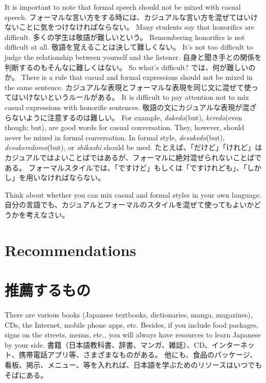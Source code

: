 \documentclass[uplatex,dvipdfmx,b5paper,english,10pt]{jsbook}
\begin{document}
\ifEnglish
It is important to note that formal speech should not be mixed with casual speech.
\else
フォーマルな言い方をする時には、カジュアルな言い方を混ぜてはいけないことに気をつけなければならない。
\fi
\ifEnglish
Many students say that honorifics are difficult.
\else
多くの学生は敬語が難しいという。
\fi
\ifEnglish
Remembering honorifics is not difficult at all.
\else
敬語を覚えることは決して難しくない。
\fi
\ifEnglish
It's not too difficult to judge the relationship between yourself and the listener.
\else
自身と聞き手との関係を判断するのもそんなに難しくはない。
\fi
\ifEnglish
So what's difficult?
\else
では、何が難しいのか。
\fi
\ifEnglish
There is a rule that casual and formal expressions should not be mixed in the same sentence.
\else
カジュアルな表現とフォーマルな表現を同じ文に混ぜて使ってはいけないというルールがある。
\fi
\ifEnglish
It is difficult to pay attention not to mix casual expressions with honorific sentences.
\else
敬語の文にカジュアルな表現が混ざらないように注意するのは難しい。
\fi
\ifEnglish
For example,  {\itshape dakedo\/}(but), {\itshape keredo\/}(even though; but), are good words for casual conversation.
They, however, should never be mixed in formal conversation.
In formal style, {\itshape desukedo\/}(but), {\itshape desukeredomo\/}(but), or {\itshape shikashi\/} should be used.
\else
たとえば、「だけど」「けれど」はカジュアルではよいことばではあるが、フォーマルに絶対混ぜられないことばである。
フォーマルスタイルでは、「ですけど」もしくは「ですけれども」、「しかし」を用いなければならない。
\fi

\begin{toiquestion}
\ifEnglish
Think about whether you can mix casual and formal styles in your own language.
\else
自分の言語でも、カジュアルとフォーマルのスタイルを混ぜて使ってもよいかどうかを考えなさい。
\fi
\end{toiquestion}

\ifEnglish
\section{Recommendations}
\else
\section{推薦するもの}
\fi

\ifEnglish
There are various books (Japanese textbooks, dictionaries, manga, magazines), CDs, the Internet, mobile phone apps, etc.
Besides, if you include food packages, signs on the streets, menus, etc., you will always have resources to learn Japanese by your side.
\else
書籍（日本語教科書、辞書、マンガ、雑誌）、CD、インターネット、携帯電話アプリ等、さまざまなものがある。
他にも、食品のパッケージ、看板、掲示、メニュー、等を入れれば、日本語を学ぶためのリソースはいつでもそばにある。
\fi
\end{document}
